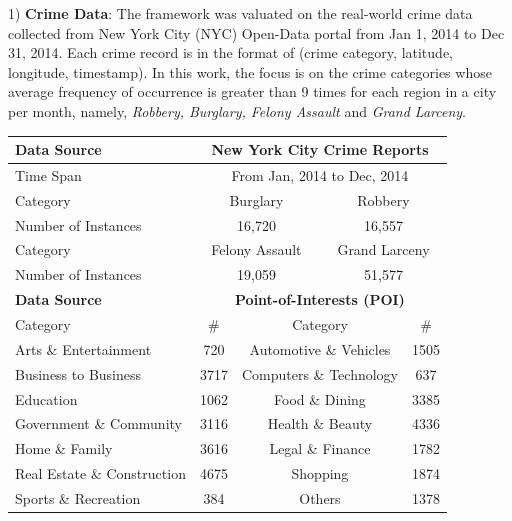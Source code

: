 1) \textbf{Crime Data}: The framework was valuated on the
real-world crime data collected from New York City (NYC) Open-Data portal from Jan 1, 2014 to Dec 31, 2014. Each crime record
is in the format of (crime category, latitude, longitude, timestamp).
In this work, the focus is on the crime categories whose average frequency of occurrence is greater than 9 times for each region in
a city per month, namely, \textit{Robbery, Burglary, Felony Assault} and
\textit{Grand Larceny}.
\begin{table}
\centering
\footnotesize
\begin{tabular}{l|c|c|c|c|c|c|}
\toprule
\textbf{Data Source} &\multicolumn{6}{|c}{\textbf{New York City Crime Reports}}\\[0.1cm]
\hline
\hline
Time Span &\multicolumn{6}{|c}{From Jan, 2014 to Dec, 2014}  \\[0.1cm]
\hline
Category &\multicolumn{3}{|c|}{Burglary}  &\multicolumn{3}{|c}{Robbery}\\[0.1cm]
\hline
Number of Instances &\multicolumn{3}{|c|}{16,720} &\multicolumn{3}{|c}{16,557}\\[0.1cm]
\hline
Category &\multicolumn{3}{|c|}{Felony Assault}  &\multicolumn{3}{|c}{Grand Larceny}\\[0.1cm]
\hline  
Number of Instances &\multicolumn{3}{|c|}{19,059} &\multicolumn{3}{|c}{51,577}\\[0.1cm]


\toprule
\textbf{Data Source} &\multicolumn{6}{|c}{\textbf{Point-of-Interests (POI)}}\\[0.1cm]
\hline
\hline
Category &\multicolumn{2}{|c|}{\#} & \multicolumn{2}{|c|}{Category} &\multicolumn{2}{|c}{\#}    \\[0.1cm]
\hline
Arts \& Entertainment &\multicolumn{2}{|c|}{720} & \multicolumn{2}{|c|}{Automotive \& Vehicles} &\multicolumn{2}{|c}{1505}    \\[0.1cm]
\hline
Business to Business &\multicolumn{2}{|c|}{3717} & \multicolumn{2}{|c|}{Computers \& Technology} &\multicolumn{2}{|c}{637}    \\[0.1cm]
\hline
Education &\multicolumn{2}{|c|}{1062} & \multicolumn{2}{|c|}{Food \& Dining} &\multicolumn{2}{|c}{3385}    \\[0.1cm]
\hline
Government \& Community &\multicolumn{2}{|c|}{3116} & \multicolumn{2}{|c|}{Health \& Beauty} &\multicolumn{2}{|c}{4336}    \\[0.1cm]
\hline
Home \& Family &\multicolumn{2}{|c|}{3616} & \multicolumn{2}{|c|}{Legal \& Finance} &\multicolumn{2}{|c}{1782}    \\[0.1cm]
\hline
Real Estate \& Construction &\multicolumn{2}{|c|}{4675} & \multicolumn{2}{|c|}{Shopping} &\multicolumn{2}{|c}{1874}    \\[0.1cm]
\hline
Sports \& Recreation &\multicolumn{2}{|c|}{384} & \multicolumn{2}{|c|}{Others} &\multicolumn{2}{|c}{1378}    \\[0.1cm]
\hline



\end{tabular}
\end{table}

